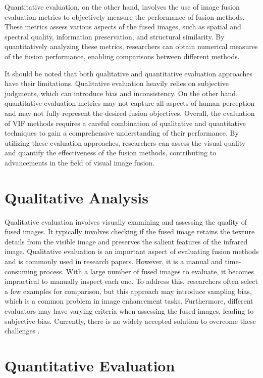 Quantitative evaluation, on the other hand, involves the use of image fusion evaluation metrics to objectively measure the performance of fusion methods. These metrics assess various aspects of the fused images, such as spatial and spectral quality, information preservation, and structural similarity. By quantitatively analyzing these metrics, researchers can obtain numerical measures of the fusion performance, enabling comparisons between different methods.

It should be noted that both qualitative and quantitative evaluation approaches have their limitations. Qualitative evaluation heavily relies on subjective judgments, which can introduce bias and inconsistency. On the other hand, quantitative evaluation metrics may not capture all aspects of human perception and may not fully represent the desired fusion objectives. Overall, the evaluation of VIF methods requires a careful combination of qualitative and quantitative techniques to gain a comprehensive understanding of their performance. By utilizing these evaluation approaches, researchers can assess the visual quality and quantify the effectiveness of the fusion methods, contributing to advancements in the field of visual image fusion.

\section{Qualitative Analysis}
\label{subsec:Qualitative}

Qualitative evaluation involves visually examining and assessing the quality of fused images. It typically involves checking if the fused image retains the texture details from the visible image and preserves the salient features of the infrared image. Qualitative evaluation is an important aspect of evaluating fusion methods and is commonly used in research papers. However, it is a manual and time-consuming process. With a large number of fused images to evaluate, it becomes impractical to manually inspect each one. To address this, researchers often select a few examples for comparison, but this approach may introduce sampling bias, which is a common problem in image enhancement tasks. Furthermore, different evaluators may have varying criteria when assessing the fused images, leading to subjective bias. Currently, there is no widely accepted solution to overcome these challenges \cite{peibei2021debiased}.

\section{Quantitative Evaluation}
\label{subsec:Quantitative}

